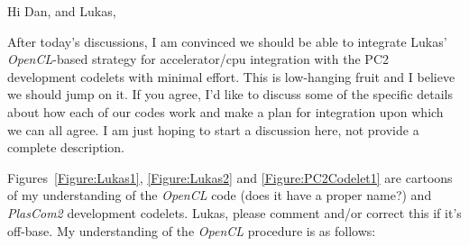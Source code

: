 \documentclass[11pt]{article}
\begin{document}
\pagestyle{plain}

Hi Dan, and Lukas,

After today's discussions, I am convinced we should be able to integrate Lukas' \textit{OpenCL}-based strategy for accelerator/cpu integration with the PC2 development codelets with minimal effort. This is low-hanging fruit and I believe we should jump on it. If you agree, I'd like to discuss some of the specific details about how each of our codes work and make a plan for integration upon which we can all agree. I am just hoping to start a discussion here, not provide a complete description.

Figures~\ref{Figure:Lukas1}, \ref{Figure:Lukas2} and \ref{Figure:PC2Codelet1} are cartoons of my understanding of the \textit{OpenCL} code (does it have a proper name?) and \textit{PlasCom2} development codelets. Lukas, please comment and/or correct this if it's off-base. My understanding of the \textit{OpenCL} procedure is as follows:
\end{document}
